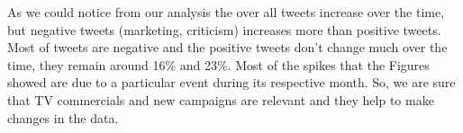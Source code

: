 \documentclass{sig-alternate}
\begin{document}
As we could notice from our analysis the over all tweets increase over the time, but negative tweets (marketing, criticism) increases more than positive tweets. Most of tweets are negative and the positive tweets don't change much over the time, they remain around 16\% and 23\%. Most of the spikes that the Figures showed are due to a particular event during its respective month. So, we are sure that TV commercials and new campaigns are relevant and they help to make changes in the data.

%
%
\end{document}
